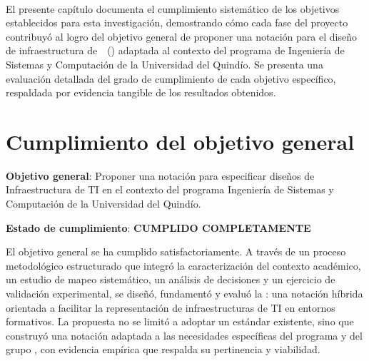 \label{cap:cumplimiento-objetivos}
\mbox{}\\

El presente capítulo documenta el cumplimiento sistemático de los objetivos establecidos para esta investigación, demostrando cómo cada fase del proyecto contribuyó al logro del objetivo general de proponer una notación para el diseño de infraestructura de~\TI~(\NDITI) adaptada al contexto del programa de Ingeniería de Sistemas y Computación de la Universidad del Quindío. Se presenta una evaluación detallada del grado de cumplimiento de cada objetivo específico, respaldada por evidencia tangible de los resultados obtenidos.

\section{Cumplimiento del objetivo general}
\noindent

\textbf{Objetivo general}: Proponer una notación para especificar diseños de Infraestructura de TI en el contexto del programa Ingeniería de Sistemas y Computación de la Universidad del Quindío.

\textbf{Estado de cumplimiento}: \textbf{CUMPLIDO COMPLETAMENTE}

El objetivo general se ha cumplido satisfactoriamente. A través de un proceso metodológico estructurado que integró la caracterización del contexto académico, un estudio de mapeo sistemático, un análisis de decisiones y un ejercicio de validación experimental, se diseñó, fundamentó y evaluó la \NDITI: una notación híbrida orientada a facilitar la representación de infraestructuras de TI en entornos formativos. La propuesta no se limitó a adoptar un estándar existente, sino que construyó una notación adaptada a las necesidades específicas del programa y del grupo \GRID, con evidencia empírica que respalda su pertinencia y viabilidad.

